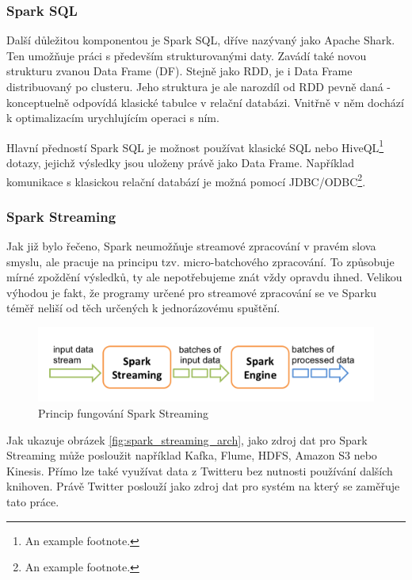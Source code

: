 \documentclass[thesis=B,czech]{FITthesis}[2012/06/26]
\begin{document}
\subsubsection{Spark SQL}
	Další důležitou komponentou je Spark SQL, dříve nazývaný jako Apache Shark. Ten umožňuje práci s především strukturovanými daty. Zavádí také novou strukturu zvanou Data Frame (DF). Stejně jako RDD, je i Data Frame distribuovaný po clusteru. Jeho struktura je ale narozdíl od RDD pevně daná - konceptuelně odpovídá klasické tabulce v relační databázi. Vnitřně v něm dochází k optimalizacím urychlujícím operaci s ním. 
	
	Hlavní předností Spark SQL je možnost používat klasické SQL nebo HiveQL\footnote{An example footnote.} dotazy, jejichž výsledky jsou uloženy právě jako Data Frame. Například komunikace s klasickou relační databází je možná pomocí JDBC/ODBC\footnote{An example footnote.}. 


\subsubsection{Spark Streaming}
	Jak již bylo řečeno, Spark neumožňuje streamové zpracování v pravém slova smyslu, ale pracuje na principu tzv. micro-batchového zpracování. To způsobuje mírné zpoždění výsledků, ty ale nepotřebujeme znát vždy opravdu ihned. Velikou výhodou je fakt, že programy určené pro streamové zpracování se ve Sparku téměř neliší od těch určených k jednorázovému spuštění. 

	\begin{figure}[ht]
    	\centering
    	\includegraphics[width=1\textwidth]{images/spark-streaming-flow.png}
    	\caption{Princip fungování Spark Streaming\cite{streaming-guide}}
    	\label{fig:spark_streaming_flow}
	\end{figure}
	
	Jak ukazuje obrázek \ref{fig:spark_streaming_arch}, jako zdroj dat pro Spark Streaming může posloužit například Kafka, Flume, HDFS, Amazon S3 nebo Kinesis. Přímo lze také využívat data z Twitteru bez nutnosti používání dalších knihoven. Právě Twitter poslouží jako zdroj dat pro systém na který se zaměřuje tato práce.  
\end{document}
